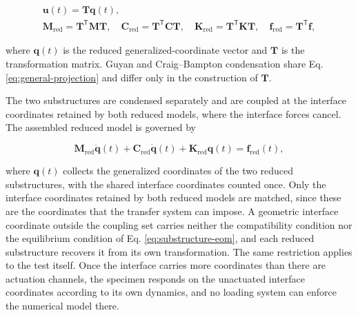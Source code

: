 \documentclass[a4paper,fleqn,review,12pt]{cas-sc}
\numberwithin{equation}{section}
\begin{document}
\vspace{-3.5em}
\begin{equation}
	\begin{gathered}
		\bm{u}(t)=\mathbf{T}\bm{q}(t),\\
		\mathbf{M}_{\mathrm{red}}=\mathbf{T}^{\mathsf{T}}\mathbf{M}\mathbf{T},\quad
		\mathbf{C}_{\mathrm{red}}=\mathbf{T}^{\mathsf{T}}\mathbf{C}\mathbf{T},\quad
		\mathbf{K}_{\mathrm{red}}=\mathbf{T}^{\mathsf{T}}\mathbf{K}\mathbf{T},\quad
		\bm{f}_{\mathrm{red}}=\mathbf{T}^{\mathsf{T}}\bm{f},
	\end{gathered}
	\label{eq:general-projection}
\end{equation}
\vspace{-3.5em}

\noindent where \(\bm{q}(t)\) is the reduced generalized-coordinate vector and \(\mathbf{T}\) is the transformation matrix. Guyan and Craig--Bampton condensation share Eq. \eqref{eq:general-projection} and differ only in the construction of \(\mathbf{T}\).

The two substructures are condensed separately and are coupled at the interface coordinates retained by both reduced models, where the interface forces cancel. The assembled reduced model is governed by

\vspace{-3.5em}
\begin{equation}
	\mathbf{M}_{\mathrm{red}}\ddot{\bm{q}}(t)
	+\mathbf{C}_{\mathrm{red}}\dot{\bm{q}}(t)
	+\mathbf{K}_{\mathrm{red}}\bm{q}(t)
	=\bm{f}_{\mathrm{red}}(t),
	\label{eq:assembled-reduced}
\end{equation}
\vspace{-3.5em}

\noindent where \(\bm{q}(t)\) collects the generalized coordinates of the two reduced substructures, with the shared interface coordinates counted once. Only the interface coordinates retained by both reduced models are matched, since these are the coordinates that the transfer system can impose. A geometric interface coordinate outside the coupling set carries neither the compatibility condition nor the equilibrium condition of Eq. \eqref{eq:substructure-eom}, and each reduced substructure recovers it from its own transformation. The same restriction applies to the test itself. Once the interface carries more coordinates than there are actuation channels, the specimen responds on the unactuated interface coordinates according to its own dynamics, and no loading system can enforce the numerical model there.
\end{document}
